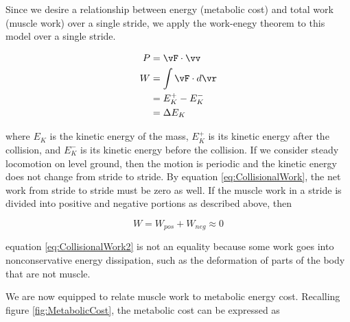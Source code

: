 Since we desire a relationship between energy (metabolic cost) and total work (muscle work) over a single stride, we apply the work-enegy theorem to this model over a single stride.

\begin{align}
P &= \vF \cdot \vv \notag \\
W &= \int \vF \cdot d\vr \notag \\
  &= E^{+}_{K} - E^{-}_{K} \notag \\
 &= \Delta E_K
\label{eq:CollisionalWork}
\end{align}

where $E_{K}$ is the kinetic energy of the mass, $E_{K}^{+}$ is its kinetic energy after the collision, and $E_{K}^{-}$ is its kinetic energy before the collision. If we consider steady locomotion on level ground, then the motion is periodic and the kinetic energy does not change from stride to stride. By equation \ref{eq:CollisionalWork}, the net work from stride to stride must be zero as well. If the muscle work in a stride is divided into positive and negative portions as described above, then

\begin{equation}
W = W_{pos} + W_{neg} \approx 0
\label{eq:CollisionalWork2}
\end{equation}

equation \ref{eq:CollisionalWork2} is not an equality because some work goes into nonconservative energy dissipation, such as the deformation of parts of the body that are not muscle.


We are now equipped to relate muscle work to metabolic energy cost. Recalling figure \ref{fig:MetabolicCost}, the metabolic cost can be expressed as


